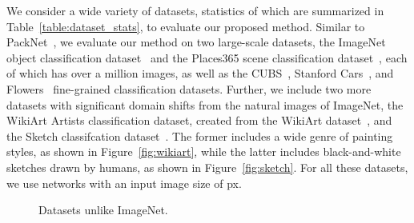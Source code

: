 \documentclass{llncs}
\begin{document}
We consider a wide variety of datasets, statistics of which are summarized in Table~\ref{table:dataset_stats}, to evaluate our proposed method.
Similar to PackNet~\cite{mallya2017packnet}, we evaluate our method on two large-scale datasets, the ImageNet object classification dataset~\cite{ILSVRC15} and the Places365 scene classification dataset~\cite{zhou2017places}, each of which has over a million images, as well as the CUBS~\cite{WahCUB_200_2011}, Stanford Cars~\cite{krause20133d}, and Flowers~\cite{Nilsback08} fine-grained classification datasets. Further, we include two more datasets with significant domain shifts from the natural images of ImageNet, the WikiArt Artists classification dataset, created from the WikiArt dataset~\cite{saleh2015large}, and the Sketch classifcation dataset~\cite{eitz2012humans}. The former includes a wide genre of painting styles, as shown in Figure~\ref{fig:wikiart}, while the latter includes black-and-white sketches drawn by humans, as shown in Figure~\ref{fig:sketch}. For all these datasets, we use networks with an input image size of  px.

\begin{figure*}
  \begin{minipage}{0.55\textwidth}
    \centering
    \vspace{9pt}
     
    \label{table:dataset_stats}
  \end{minipage}\hfill
  \begin{minipage}{.42\textwidth}
    \centering
    \hfill
    \caption{Datasets unlike ImageNet.}
    \label{fig:dataset}
  \end{minipage}\end{figure*}
\end{document}

